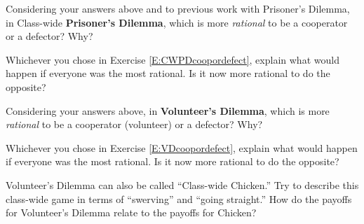\begin{xca}\label{E:CWPDcoopordefect} 
Considering your answers above and to previous work with Prisoner's Dilemma, in Class-wide \textbf{Prisoner's Dilemma}, which is more \emph{rational} to be a cooperator or a defector? Why?
\end{xca} 

\begin{xca}\label{E:CWPDallrational}
Whichever you chose in Exercise \ref{E:CWPDcoopordefect}, explain what would happen if everyone was the most rational. Is it now more rational to do the opposite?
\end{xca}

\begin{xca}\label{E:VDcoopordefect}
Considering your answers above, in \textbf{Volunteer's Dilemma}, which is more \emph{rational} to be a cooperator (volunteer) or a defector? Why?
\end{xca}


\begin{xca}\label{E:VDallrational}
Whichever you chose in Exercise \ref{E:VDcoopordefect}, explain what would happen if everyone was the most rational. Is it now more rational to do the opposite?
\end{xca}

\begin{xca}\label{E:classchicken}  
Volunteer's Dilemma can also be called ``Class-wide Chicken.'' Try to describe this class-wide game in terms of ``swerving'' and ``going straight.'' How do the payoffs for Volunteer's Dilemma relate to the payoffs for Chicken?
\end{xca}





 